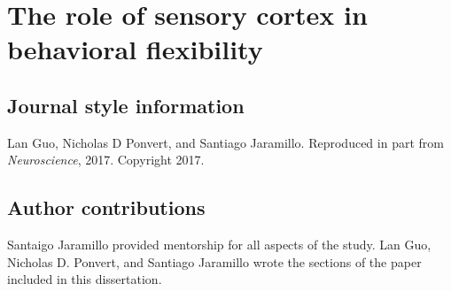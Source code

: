 \newcommand{\Tasks}{5.1}
\newcommand{\StimOutcome}{\Tasks A}
\newcommand{\StimAction}{\Tasks B}
\newcommand{\FeatureRelevance}{\Tasks C}

\newcommand{\Mechanisms}{5.2}
\newcommand{\LTP}{\Tasks A}
\newcommand{\TopDown}{\Tasks A}

\chapter{The role of sensory cortex in behavioral flexibility}

\section{Journal style information}
\noindent Lan Guo, Nicholas D Ponvert, and Santiago Jaramillo. Reproduced in part from \textit{Neuroscience}, 2017. Copyright 2017.

\section{Author contributions}
Santaigo Jaramillo provided mentorship for all aspects of the study. Lan Guo, Nicholas D. Ponvert, and Santiago Jaramillo wrote the sections of the paper included in this dissertation.


